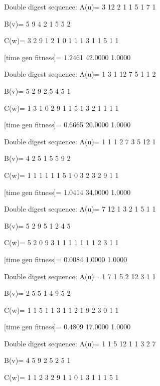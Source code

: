 Double digest sequence:
A(u)=
     3    12     2     1     1     5     1     7     1

B(v)=
     5     9     4     2     1     5     5     2

C(w)=
     3     2     9     1     2     1     0     1     1     1     3     1     1     5     1     1

[time gen fitness]=
    1.2461   42.0000    1.0000

Double digest sequence:
A(u)=
     1     3     1    12     7     5     1     1     2

B(v)=
     5     2     9     2     5     4     5     1

C(w)=
     1     3     1     0     2     9     1     1     5     1     3     2     1     1     1     1

[time gen fitness]=
    0.6665   20.0000    1.0000

Double digest sequence:
A(u)=
     1     1     1     2     7     3     5    12     1

B(v)=
     4     2     5     1     5     5     9     2

C(w)=
     1     1     1     1     1     1     5     1     0     3     2     3     2     9     1     1

[time gen fitness]=
    1.0414   34.0000    1.0000

Double digest sequence:
A(u)=
     7    12     1     3     2     1     5     1     1

B(v)=
     5     2     9     5     1     2     4     5

C(w)=
     5     2     0     9     3     1     1     1     1     1     1     1     2     3     1     1

[time gen fitness]=
    0.0084    1.0000    1.0000

Double digest sequence:
A(u)=
     1     7     1     5     2    12     3     1     1

B(v)=
     2     5     5     1     4     9     5     2

C(w)=
     1     1     5     1     1     3     1     1     2     1     9     2     3     0     1     1

[time gen fitness]=
    0.4809   17.0000    1.0000

Double digest sequence:
A(u)=
     1     1     5    12     1     1     3     2     7

B(v)=
     4     5     9     2     5     2     5     1

C(w)=
     1     1     2     3     2     9     1     1     0     1     3     1     1     1     5     1

